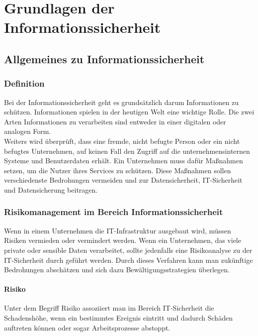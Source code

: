 \chapter{Grundlagen der Informationssicherheit}
\strahlhofer

\section{Allgemeines zu Informationssicherheit}
\subsection{Definition}
Bei der Informationssicherheit geht es grundsätzlich darum Informationen zu schützen. Informationen spielen in der heutigen Welt eine wichtige Rolle. Die zwei Arten Informationen zu verarbeiten sind entweder in einer digitalen oder analogen Form. 
\\
Weiters wird überprüft, dass eine fremde, nicht befugte Person oder ein nicht befugtes Unternehmen, auf keinen Fall den Zugriff auf die unternehmensinternen Systeme und Benutzerdaten erhält. Ein Unternehmen muss dafür Maßnahmen setzen, um die Nutzer ihres Services zu schützen. Diese Maßnahmen sollen verschiedenste Bedrohungen vermeiden und zur Datensicherheit, IT-Sicherheit und Datensicherung beitragen.
\\


\subsection{Risikomanagement im Bereich Informationssicherheit}
Wenn in einem Unternehmen die IT-Infrastruktur ausgebaut wird, müssen Risiken vermieden oder vermindert werden. Wenn ein Unternehmen, das viele private oder sensible Daten verarbeitet, sollte jedenfalls eine Risikoanalyse zu der IT-Sicherheit durch geführt werden. Durch dieses Verfahren kann man zukünftige Bedrohungen abschätzen und sich dazu Bewältigungsstrategien überlegen.

\subsubsection{Risiko}
Unter dem Begriff Risiko assoziiert man im Bereich IT-Sicherheit die Schadenshöhe, wenn ein bestimmtes Ereignis eintritt und dadurch Schäden auftreten können oder sogar Arbeitsprozesse abstoppt.

